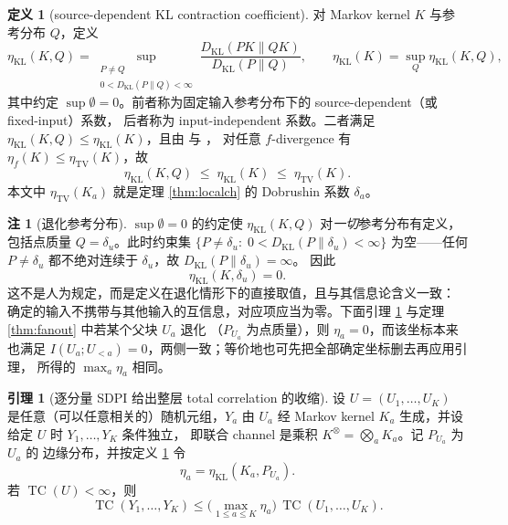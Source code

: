\documentclass[a4paper,11pt]{article}
\theoremstyle{definition}
\newtheorem{lemma}{引理}
\newtheorem{definition}{定义}
\newtheorem{remark}{注}
\newcommand{\1}{\mathbf 1}
\newcommand{\TV}{\mathrm{TV}}
\newcommand{\KL}{\mathrm{KL}}
\newcommand{\TC}{\operatorname{TC}}
\newcommand{\Kprod}{K^{\otimes}}
\begin{document}
\begin{definition}[source-dependent KL contraction coefficient]
\label{def:etasrc}
对 Markov kernel $K$ 与参考分布 $Q$，定义
\[
\eta_{\KL}(K,Q)
=
\sup_{\substack{P\neq Q\\ 0<D_{\KL}(P\|Q)<\infty}}
\frac{D_{\KL}(PK\|QK)}{D_{\KL}(P\|Q)},
\qquad
\eta_{\KL}(K)=\sup_{Q}\eta_{\KL}(K,Q),
\]
其中约定 $\sup\emptyset=0$。前者称为固定输入参考分布下的
source-dependent（或 fixed-input）系数，
后者称为 input-independent 系数。二者满足
$\eta_{\KL}(K,Q)\le\eta_{\KL}(K)$，且由
\cite[Theorem 1]{PolyanskiyWu2017} 与 \cite[Theorem 4.1]{Cohen1993}，
对任意 $f$-divergence 有 $\eta_f(K)\le\eta_{\TV}(K)$，故
\[
\eta_{\KL}(K,Q)\;\le\;\eta_{\KL}(K)\;\le\;\eta_{\TV}(K).
\]
本文中 $\eta_{\TV}(K_a)$ 就是定理 \ref{thm:localch} 的 Dobrushin 系数
$\delta_a$。
\end{definition}

\begin{remark}[退化参考分布]
\label{rem:degenerate}
$\sup\emptyset=0$ 的约定使 $\eta_{\KL}(K,Q)$ 对\emph{一切}参考分布有定义，
包括点质量 $Q=\delta_u$。此时约束集
$\{P\neq\delta_u:\;0<D_{\KL}(P\|\delta_u)<\infty\}$ 为空——任何
$P\neq\delta_u$ 都不绝对连续于 $\delta_u$，故 $D_{\KL}(P\|\delta_u)=\infty$。
因此
\[
\eta_{\KL}(K,\delta_u)=0 .
\]
这不是人为规定，而是定义在退化情形下的直接取值，且与其信息论含义一致：
确定的输入不携带与其他输入的互信息，对应项应当为零。下面引理
\ref{lem:tcsdpi} 与定理 \ref{thm:fanout} 中若某个父块 $U_a$ 退化
（$P_{U_a}$ 为点质量），则 $\eta_a=0$，而该坐标本来也满足
$I(U_a;U_{<a})=0$，两侧一致；等价地也可先把全部确定坐标删去再应用引理，
所得的 $\max_a\eta_a$ 相同。
\end{remark}

\begin{lemma}[逐分量 SDPI 给出整层 total correlation 的收缩]
\label{lem:tcsdpi}
设 $U=(U_1,\ldots,U_K)$ 是任意（可以任意相关的）随机元组，$Y_a$ 由 $U_a$
经 Markov kernel $K_a$ 生成，并设给定 $U$ 时 $Y_1,\ldots,Y_K$ 条件独立，
即联合 channel 是乘积 $\Kprod=\bigotimes_aK_a$。记 $P_{U_a}$ 为 $U_a$ 的
边缘分布，并按定义 \ref{def:etasrc} 令
\[
\eta_a=\eta_{\KL}(K_a,P_{U_a}).
\]
若 $\TC(U)<\infty$，则
\[
\TC(Y_1,\ldots,Y_K)
\le
\Big(\max_{1\le a\le K}\eta_a\Big)\,\TC(U_1,\ldots,U_K).
\]
\end{lemma}
\end{document}
